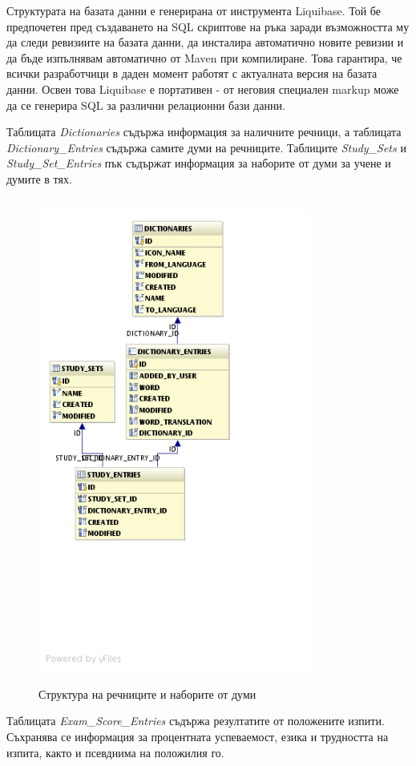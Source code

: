 Структурата на базата данни е генерирана от инструмента Liquibase. Той
бе предпочетен пред създаването на SQL скриптове на ръка заради
възможността му да следи ревизиите на базата данни, да инсталира
автоматично новите ревизии и да бъде изпълнявам автоматично от Maven
при компилиране. Това гарантира, че всички разработчици в даден момент
работят с актуалната версия на базата данни. Освен това Liquibase е
портативен - от неговия специален markup може да се генерира SQL за
различни релационни бази данни.

Таблицата \emph{Dictionaries} съдържа информация за наличните речници,
а таблицата \emph{Dictionary\_Entries} съдържа самите думи на
речниците. Таблиците \emph{Study\_Sets} и \emph{Study\_Set\_Entries} пък
съдържат информация за наборите от думи за учене и думите в тях. 

\begin{figure}[htbp]
  \caption{Структура на речниците и наборите от думи}
  \centering
  \includegraphics[width=90mm, height=160mm]{images/db_diagram.png}
\end{figure}

Таблицата \emph{Exam\_Score\_Entries} съдържа резултатите от положените
изпити. Съхранява се информация за процентната успеваемост, езика и
трудността на изпита, както и псевднима на положилия го.

